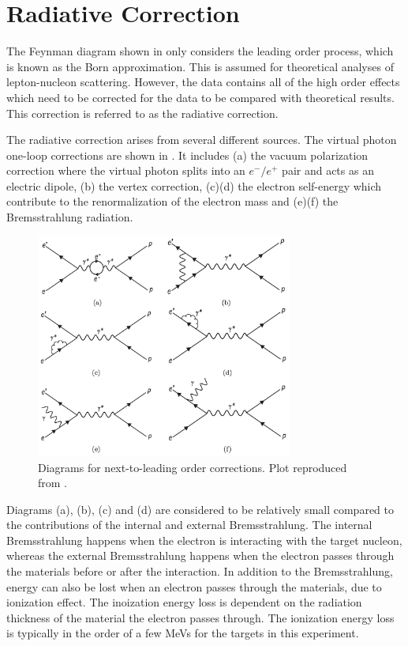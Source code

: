 \section{Radiative Correction}
\label{C8S2}

The Feynman diagram shown in  only considers the leading order process, which is known as the Born approximation. This is assumed for theoretical analyses of lepton-nucleon scattering. However, the data contains all of the high order effects which need to be corrected for the data to be compared with theoretical results. This correction is referred to as the radiative correction.

The radiative correction arises from several different sources. The virtual photon one-loop corrections are shown in . It includes (a) the vacuum polarization correction where the virtual photon splits into an $e^-/e^+$ pair and acts as an electric dipole, (b) the vertex correction, (c)(d) the electron self-energy which contribute to the renormalization of the electron mass and (e)(f) the Bremsstrahlung radiation.

\begin{figure}[tb!]
  \centering
  \includegraphics[width=0.75\textwidth]{figs/one-loop-corrections.png}
  \caption[Diagrams for next-to-leading order corrections.]{Diagrams for next-to-leading order corrections. Plot reproduced from \cite{Zielinski2014b}. \label{C8S2F1}}
\end{figure}

Diagrams (a), (b), (c) and (d) are considered to be relatively small compared to the contributions of the internal and external Bremsstrahlung. The internal Bremsstrahlung happens when the electron is interacting with the target nucleon, whereas the external Bremsstrahlung happens when the electron passes through the materials before or after the interaction. In addition to the Bremsstrahlung, energy can also be lost when an electron passes through the materials, due to ionization effect. The inoization energy loss is dependent on the radiation thickness of the material the electron passes through. The ionization energy loss is typically in the order of a few MeVs for the targets in this experiment.

